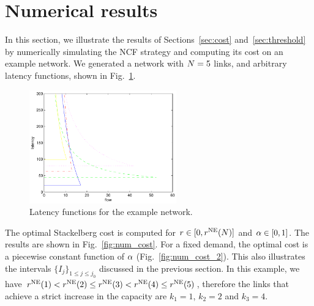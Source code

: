 
\section{Numerical results}
\label{sec:numerical}

In this section, we illustrate the results of Sections~\ref{sec:cost} and~\ref{sec:threshold} by numerically simulating the NCF strategy and computing its cost on an example network.
We generated a network with $N = 5$ links, and arbitrary latency functions, shown in Fig.~\ref{fig:num_latencies}. 

\begin{figure}[h]
\centering
\includegraphics[width = 2.5in]{figures/latencies}
\caption{Latency functions for the example network.}
\label{fig:num_latencies}
\end{figure}

The optimal Stackelberg cost is computed for ${ r \in [0, r^{\textup{NE}} ( N )] }$ and $\alpha \in [0,1]$. The results are shown in Fig.~\ref{fig:num_cost}. For a fixed demand, the optimal cost is a piecewise constant function of $\alpha$ (Fig.~\ref{fig:num_cost_2}). This also illustrates the intervals $\{I_j\}_{1 \leq j \leq j_0}$ discussed in the previous section. In this example, we have $r^{\textup{NE}} ( 1 ) < r^{\textup{NE}} ( 2 ) \leq r^{\textup{NE}} ( 3 ) < r^{\textup{NE}} ( 4 ) \leq r^{\textup{NE}} ( 5 )$, therefore the links that achieve a strict increase in the capacity are $k_1 = 1$, $k_2 = 2$ and $k_3 = 4$.

